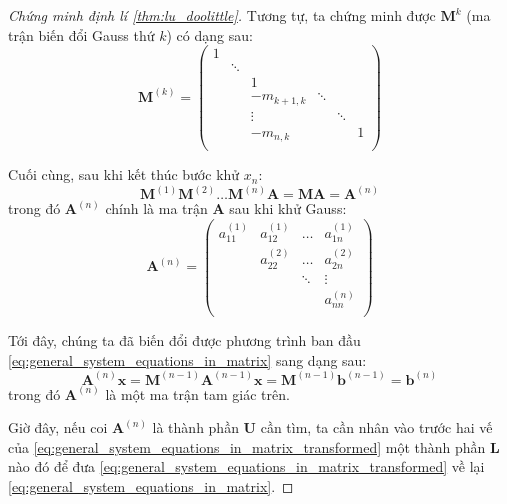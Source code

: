 \documentclass[../../Lectures]{subfiles}
\begin{document}
\begin{proof}[Chứng minh định lí \ref{thm:lu_doolittle}]
    Tương tự, ta chứng minh được \(\bm{M}^{k}\) (ma trận biến đổi Gauss thứ
    \(k\)) có dạng sau:
    \[
        \bm{M}^{(k)} =
            \begin{pmatrix}
                1  &          &                 &          &          &     \\
                   &  \ddots  &                 &          &          &     \\
                   &          &        1        &          &          &     \\
                   &          &  -m_{k + 1, k}  &  \ddots  &          &     \\
                   &          &      \vdots     &          &  \ddots  &     \\
                   &          &  -m_{n, k}      &          &          &  1  \\
            \end{pmatrix}
    \]

    Cuối cùng, sau khi kết thúc bước khử \(x_n\):
    \[
        \bm{M}^{(1)} \bm{M}^{(2)} \ldots \bm{M}^{(n)} \bm{A} = \bm{M} \bm{A} = \bm{A}^{(n)}
    \]
    trong đó \(\bm{A}^{(n)}\) chính là ma trận \(\bm{A}\) sau khi khử Gauss:
    \[
        \bm{A}^{(n)} =
            \begin{pmatrix}
                a_{11}^{(1)}  &  a_{12}^{(1)}  &  \dots   &  a_{1n}^{(1)}  \\
                              &  a_{22}^{(2)}  &  \dots   &  a_{2n}^{(2)}  \\
                              &                &  \ddots  &     \vdots     \\
                              &                &          &  a_{nn}^{(n)}  \\
            \end{pmatrix}
    \]

    Tới đây, chúng ta đã biến đổi được phương trình ban đầu
    \eqref{eq:general_system_equations_in_matrix} sang dạng sau:
    \begin{equation}\label{eq:general_system_equations_in_matrix_transformed}
        \bm{A}^{(n)} \bm{x} = \bm{M}^{(n - 1)} \bm{A}^{(n - 1)} \bm{x} = \bm{M}^{(n - 1)} \bm{b}^{(n - 1)} = \bm{b}^{(n)}
    \end{equation}
    trong đó \(\bm{A}^{(n)}\) là một ma trận tam giác trên.

    Giờ đây, nếu coi \(\bm{A}^{(n)}\) là thành phần \(\bm{U}\) cần tìm, ta cần
    nhân vào trước hai vế của
    \eqref{eq:general_system_equations_in_matrix_transformed} một thành phần
    \(\bm{L}\) nào đó để đưa
    \eqref{eq:general_system_equations_in_matrix_transformed} về lại
    \eqref{eq:general_system_equations_in_matrix}.


\end{proof}
\end{document}
